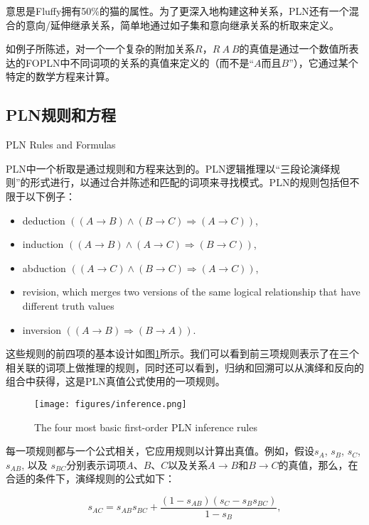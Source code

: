 意思是Fluffy拥有50\%的猫的属性。为了更深入地构建这种关系，PLN还有一个混合的意向/延伸继承关系，简单地通过如子集和意向继承关系的析取来定义。

如例子所陈述，对一个一个复杂的附加关系$R$，$R \ A \ B$的真值是通过一个数值所表达的FOPLN中不同词项的关系的真值来定义的（而不是“$A$而且$B$”），它通过某个特定的数学方程来计算。

\subsection{PLN规则和方程}{PLN Rules and Formulas}

PLN中一个析取是通过规则和方程来达到的。PLN逻辑推理以“三段论演绎规则”的形式进行，以通过合并陈述和匹配的词项来寻找模式。PLN的规则包括但不限于以下例子：

\begin{itemize}
\item deduction $\left((A\rightarrow B) \wedge (B\rightarrow C) \Rightarrow (A\rightarrow C)\right)$,
\item induction $\left((A\rightarrow B) \wedge (A\rightarrow C) \Rightarrow
(B\rightarrow C)\right)$,
\item abduction $\left((A\rightarrow C) \wedge (B\rightarrow C) \Rightarrow
(A\rightarrow C)\right)$,
  \item revision, which merges two versions of the same logical relationship that have different truth values
\item inversion $\left((A\rightarrow B) \Rightarrow
  (B\rightarrow A)\right)$.
\end{itemize}

这些规则的前四项的基本设计如图\ref{fig:inference}所示。我们可以看到前三项规则表示了在三个相关联的词项上做推理的规则，同时还可以看到，归纳和回溯可以从演绎和反向的组合中获得，这是PLN真值公式使用的一项规则。

\begin{figure}[htb]
  \center
  \texttt{[image: figures/inference.png]}
  \caption{The four most basic first-order PLN inference rules}
  \label{fig:inference}
\end{figure}

每一项规则都与一个公式相关，它应用规则以计算出真值。例如，假设$s_A$, $s_B$, $s_C$, $s_{AB}$, 以及 $s_{BC}$分别表示词项$A$、$B$、$C$以及关系$A\rightarrow B$和$B\rightarrow C$的真值，那么，在合适的条件下，演绎规则的公式如下：

$$s_{AC}=s_{AB}s_{BC}+\frac{\left(1-s_{AB}\right)\left(s_C-s_Bs_{BC}\right)}{1-s_B},$$

